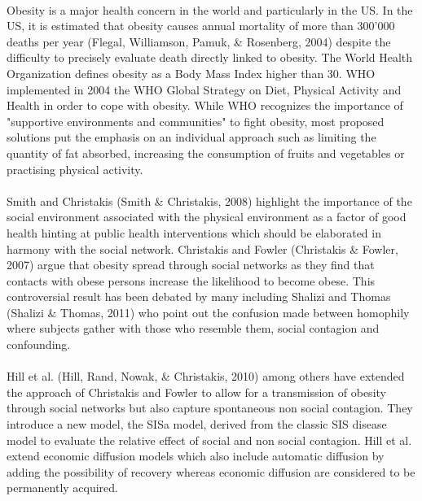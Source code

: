 \documentclass[11pt]{article}
\begin{document}
\paragraph{}
Obesity is a major health concern in the world and particularly in the US. In the US, it is estimated that obesity causes annual mortality of more than 300'000 deaths per year (Flegal, Williamson, Pamuk, \& Rosenberg, 2004) despite the difficulty to precisely evaluate death directly linked to obesity. The World Health Organization defines obesity as a Body Mass Index higher than 30. WHO implemented in 2004 the WHO Global Strategy on Diet, Physical Activity and Health in order to cope with obesity. While WHO recognizes the importance of "supportive environments and communities" to fight obesity, most proposed solutions put the emphasis on an individual approach such as limiting the quantity of fat absorbed, increasing the consumption of fruits and vegetables or practising physical activity. 

\paragraph{}
Smith and Christakis (Smith \& Christakis, 2008)  highlight the importance of the social environment associated with the physical environment as a factor of good health hinting at public health interventions which should be elaborated in harmony with the social network. Christakis and Fowler (Christakis \& Fowler, 2007) argue that obesity spread  through social networks as they find that contacts with obese persons increase the likelihood to become obese. This controversial result has been debated by many including Shalizi and Thomas (Shalizi \& Thomas, 2011) who point out the confusion made between homophily where subjects gather with those who resemble them, social contagion and confounding.

\paragraph{}
Hill et al. (Hill, Rand, Nowak, \& Christakis, 2010) among others have extended the approach of Christakis and Fowler to allow for a transmission of obesity through social networks but also capture spontaneous non social contagion. They introduce a new model, the SISa model, derived from the classic SIS disease model to evaluate the relative effect of social and non social contagion. Hill et al. extend economic diffusion models which also include automatic diffusion by adding the possibility of recovery whereas economic diffusion are considered to be permanently acquired.
\end{document}
